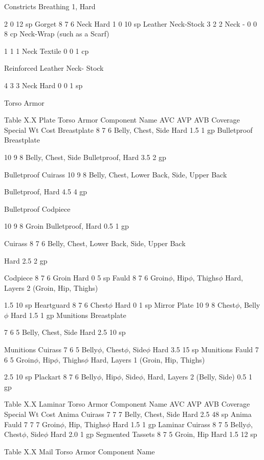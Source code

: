 \documentclass[oneside,11pt,english]{book}
\begin{document}
Constricts Breathing 1, 
Hard 

2 0 12 
sp 
Gorget 8 7 6 Neck Hard 1 0 10 
sp 
Leather Neck-Stock 3 2 2 Neck - 0 0 8 cp 
Neck-Wrap (such as a 
Scarf) 

1 1 1 Neck Textile 0 0 1 cp 

Reinforced Leather Neck-
Stock 

4 3 3 Neck Hard 0 0 1 sp 

 

Torso Armor 

 

Table X.X Plate Torso Armor 
Component Name AVC AVP AVB Coverage Special Wt Cost 
Breastplate 8 7 6 Belly, Chest, Side Hard 1.5 1 gp 
Bulletproof 
Breastplate 

10 9 8 Belly, Chest, Side Bulletproof, Hard 3.5 2 gp 

Bulletproof Cuirass 10 9 8 Belly, Chest, Lower Back, Side, 
Upper Back 

Bulletproof, Hard 4.5 4 gp 

Bulletproof 
Codpiece 

10 9 8 Groin Bulletproof, Hard 0.5 1 gp 

Cuirass 8 7 6 Belly, Chest, Lower Back, Side, 
Upper Back 

Hard 2.5 2 gp 

Codpiece 8 7 6 Groin Hard 0 5 sp 
Fauld 8 7 6 Groin$\phi$, Hip$\phi$, Thighs$\phi$ Hard, Layers 2 (Groin, Hip, 
Thighs) 

1.5 10 
sp 
Heartguard 8 7 6 Chest$\phi$ Hard 0 1 sp 
Mirror Plate 10 9 8 Chest$\phi$, Belly$\phi$ Hard 1.5 1 gp 
Munitions 
Breastplate 

7 6 5 Belly, Chest, Side Hard 2.5 10 
sp 


Munitions Cuirass 7 6 5 Belly$\phi$, Chest$\phi$, Side$\phi$ Hard 3.5 15 
sp 
Munitions Fauld 7 6 5 Groin$\phi$, Hip$\phi$, Thighs$\phi$ Hard, Layers 1 (Groin, Hip, 
Thighs) 

2.5 10 
sp 
Plackart 8 7 6 Belly$\phi$, Hip$\phi$, Side$\phi$, Hard, Layers 2 (Belly, Side) 0.5 1 gp 

 
Table X.X Laminar Torso Armor 
Component Name AVC AVP AVB Coverage Special Wt Cost 
Anima Cuirass 7 7 7 Belly, Chest, Side Hard 2.5 48 sp 
Anima Fauld 7 7 7 Groin$\phi$, Hip, Thighs$\phi$ Hard 1.5 1 gp 
Laminar Cuirass 8 7 5 Belly$\phi$, Chest$\phi$, Side$\phi$ Hard 2.0 1 gp 
Segmented Tassets 8 7 5 Groin, Hip Hard 1.5 12 sp 

 
Table X.X Mail Torso Armor 
Component 
Name 
\end{document}
